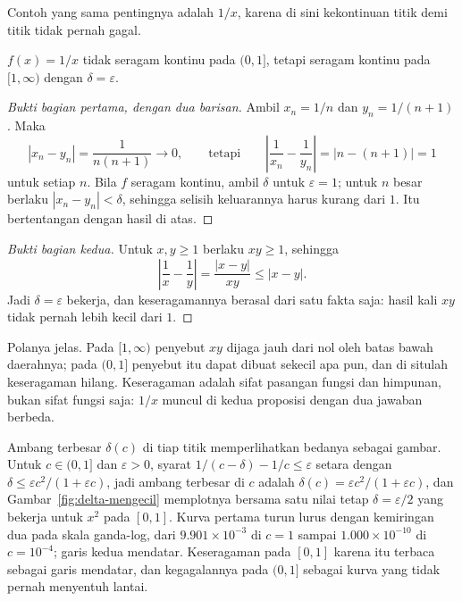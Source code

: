 Contoh yang sama pentingnya adalah $1/x$, karena di sini kekontinuan titik demi titik
tidak pernah gagal.

\begin{proposisi}
$f(x)=1/x$ tidak seragam kontinu pada $(0,1]$, tetapi seragam kontinu pada
$[1,\infty)$ dengan $\delta=\varepsilon$.
\end{proposisi}

\begin{proof}[Bukti bagian pertama, dengan dua barisan]
Ambil $x_{n}=1/n$ dan $y_{n}=1/(n+1)$. Maka
\[
|x_{n}-y_{n}|=\frac{1}{n(n+1)}\longrightarrow 0,
\qquad\text{tetapi}\qquad
\left|\frac{1}{x_{n}}-\frac{1}{y_{n}}\right|=|n-(n+1)|=1
\]
untuk setiap $n$. Bila $f$ seragam kontinu, ambil $\delta$ untuk $\varepsilon=1$;
untuk $n$ besar berlaku $|x_{n}-y_{n}|<\delta$, sehingga selisih keluarannya harus
kurang dari $1$. Itu bertentangan dengan hasil di atas.
\end{proof}

\begin{proof}[Bukti bagian kedua]
Untuk $x,y\ge 1$ berlaku $xy\ge 1$, sehingga
\[
\left|\frac{1}{x}-\frac{1}{y}\right|=\frac{|x-y|}{xy}\le|x-y| .
\]
Jadi $\delta=\varepsilon$ bekerja, dan keseragamannya berasal dari satu fakta saja:
hasil kali $xy$ tidak pernah lebih kecil dari $1$.
\end{proof}

Polanya jelas. Pada $[1,\infty)$ penyebut $xy$ dijaga jauh dari nol oleh batas bawah
daerahnya; pada $(0,1]$ penyebut itu dapat dibuat sekecil apa pun, dan di situlah
keseragaman hilang. Keseragaman adalah sifat pasangan fungsi dan himpunan, bukan sifat
fungsi saja: $1/x$ muncul di kedua proposisi dengan dua jawaban berbeda.

Ambang terbesar $\delta(c)$ di tiap titik memperlihatkan bedanya sebagai gambar.
Untuk $c\in(0,1]$ dan $\varepsilon>0$, syarat $1/(c-\delta)-1/c\le\varepsilon$ setara
dengan $\delta\le\varepsilon c^{2}/(1+\varepsilon c)$, jadi ambang terbesar di $c$
adalah $\delta(c)=\varepsilon c^{2}/(1+\varepsilon c)$, dan
Gambar~\ref{fig:delta-mengecil} memplotnya bersama satu nilai tetap
$\delta=\varepsilon/2$ yang bekerja untuk $x^{2}$ pada $[0,1]$. Kurva pertama turun
lurus dengan kemiringan dua pada skala ganda-log, dari $9.901\times10^{-3}$ di $c=1$
sampai $1.000\times10^{-10}$ di $c=10^{-4}$; garis kedua mendatar. Keseragaman pada
$[0,1]$ karena itu terbaca sebagai garis mendatar, dan kegagalannya pada $(0,1]$
sebagai kurva yang tidak pernah menyentuh lantai.


